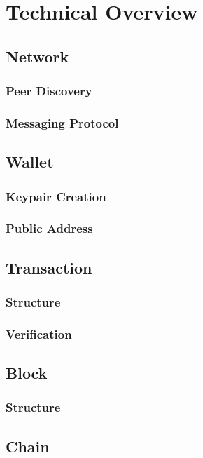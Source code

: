 \documentclass{article}
\begin{document}
\section{Technical Overview}
\subsection{Network}
\subsubsection{Peer Discovery}
\subsubsection{Messaging Protocol}

\subsection{Wallet}
\subsubsection{Keypair Creation}
\subsubsection{Public Address}

\subsection{Transaction}
\subsubsection{Structure}
\subsubsection{Verification}

\subsection{Block}
\subsubsection{Structure}

\subsection{Chain}
\end{document}
